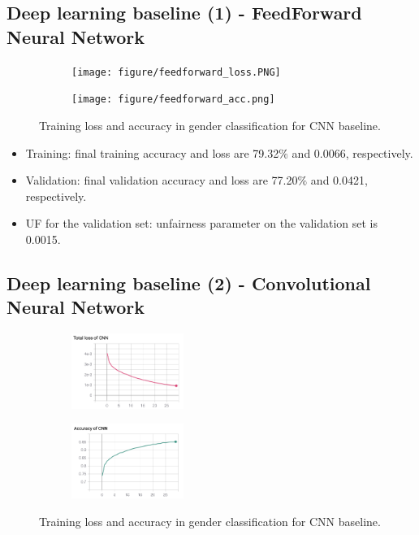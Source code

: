 \subsection{Deep learning baseline (1) - FeedForward Neural Network}

\begin{figure}[H]
	\centering
	\begin{subfigure}
		\centering
		\texttt{[image: figure/feedforward\_loss.PNG]}
	\end{subfigure}
	\quad
	\begin{subfigure}
		\centering
		\texttt{[image: figure/feedforward\_acc.png]}
	\end{subfigure}
	\caption{Training loss and accuracy in gender classification for CNN baseline.}
	\label{fig: feedforward}
\end{figure}

\begin{itemize}
\item Training: final training accuracy and loss are 79.32$\%$ and 0.0066, respectively.  

\item Validation: final validation accuracy and loss are 77.20$\%$ and 0.0421, respectively.

\item UF for the validation set: unfairness parameter on the validation set is 0.0015.   
\end{itemize}


\subsection{Deep learning baseline (2) - Convolutional Neural Network}

\begin{figure}[H]
	\centering
	\begin{subfigure}
		\centering
		\includegraphics[width=0.4\textwidth]{figure/cnn-loss.png}
	\end{subfigure}
	\quad
	\begin{subfigure}
		\centering
		\includegraphics[width=0.4\textwidth]{figure/cnn-ac.png}
	\end{subfigure}
	\caption{Training loss and accuracy in gender classification for CNN baseline.}
	\label{fig: cnn}
\end{figure}

